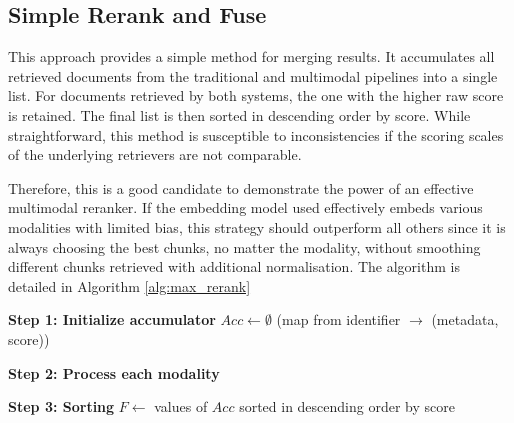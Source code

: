 \documentclass[12pt,twoside]{report}
\begin{document}
\subsection{Simple Rerank and Fuse}

This approach provides a simple method for merging results. It accumulates all retrieved documents from the traditional and multimodal pipelines into a single list. For documents retrieved by both systems, the one with the higher raw score is retained. The final list is then sorted in descending order by score. While straightforward, this method is susceptible to inconsistencies if the scoring scales of the underlying retrievers are not comparable.

Therefore, this is a good candidate to demonstrate the power of an effective multimodal reranker. If the embedding model used effectively embeds various modalities with limited bias, this strategy should outperform all others since it is always choosing the best chunks, no matter the modality, without smoothing different chunks retrieved with additional normalisation. The algorithm is detailed in Algorithm \ref{alg:max_rerank}

\begin{algorithm}[t!h]
\DontPrintSemicolon
\caption{Merge by Maximum Score Across Modalities}
\label{alg:max_rerank}
\BlankLine

\textbf{Step 1: Initialize accumulator}\;
$Acc \gets \emptyset$ (map from identifier $\rightarrow$ (metadata, score))\;

\BlankLine
\textbf{Step 2: Process each modality}\;

\BlankLine
\textbf{Step 3: Sorting}\;
$F \gets$ values of $Acc$ sorted in descending order by score\;

\BlankLine
{}\;
\end{algorithm}
\end{document}
